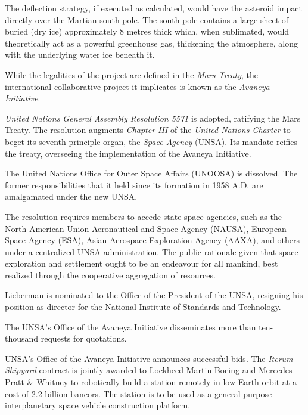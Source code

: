 The deflection strategy, if executed as calculated, would have the asteroid impact directly over the Martian south pole. The south pole contains a large sheet of buried  (dry ice) approximately 8 metres thick which, when sublimated, would theoretically act as a powerful greenhouse gas, thickening the atmosphere, along with the underlying water ice beneath it.

While the legalities of the project are defined in the {\it Mars Treaty}, the international collaborative project it implicates is known as the {\it Avaneya Initiative}.
\StopTimelineDate

{\it United Nations General Assembly Resolution 5571} is adopted, ratifying the Mars Treaty. The resolution augments {\it Chapter III} of the {\it United Nations Charter} to beget its seventh principle organ, the {\it Space Agency} (UNSA). Its mandate reifies the treaty, overseeing the implementation of the Avaneya Initiative.

The United Nations Office for Outer Space Affairs (UNOOSA) is dissolved. The former responsibilities that it held since its formation in 1958 A.D. are amalgamated under the new UNSA.

The resolution requires members to accede state space agencies, such as the North American Union Aeronautical and Space Agency (NAUSA), European Space Agency (ESA), Asian Aerospace Exploration Agency (AAXA), and others under a centralized UNSA administration. The public rationale given that space exploration and settlement ought to be an endeavour for all mankind, best realized through the cooperative aggregation of resources.

Lieberman is nominated to the Office of the President of the UNSA, resigning his position as director for the National Institute of Standards and Technology.
\StopTimelineDate

The UNSA's Office of the Avaneya Initiative disseminates more than ten-thousand requests for quotations.
\StopTimelineDate

UNSA's Office of the Avaneya Initiative announces successful bids. The {\it Iterum Shipyard} contract is jointly awarded to Lockheed Martin-Boeing and Mercedes-Pratt & Whitney to robotically build a station remotely in low Earth orbit at a cost of 2.2 billion bancors. The station is to be used as a general purpose interplanetary space vehicle construction platform.

